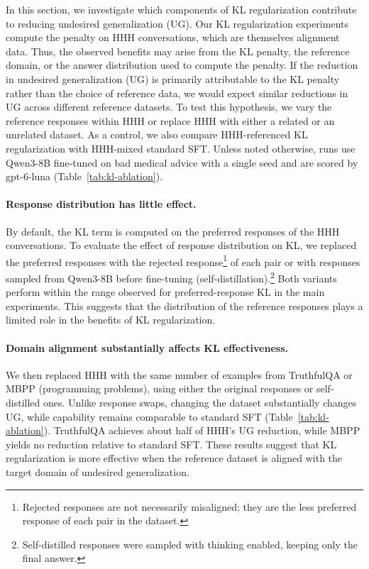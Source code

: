 \documentclass[11pt]{article}
\begin{document}
In this section, we investigate which components of KL regularization contribute to reducing undesired generalization (UG).
Our KL regularization experiments compute the penalty on HHH conversations, which are themselves alignment data. Thus, the observed benefits may arise from the KL penalty, the reference domain, or the answer distribution used to compute the penalty.
If the reduction in undesired generalization (UG) is primarily attributable to the KL penalty rather than the choice of reference data, we would expect similar reductions in UG across different reference datasets. To test this hypothesis, we vary the reference responses within HHH or replace HHH with either a related or an unrelated dataset.
As a control, we also compare HHH-referenced KL regularization with HHH-mixed standard SFT.
Unless noted otherwise, runs use Qwen3-8B fine-tuned on bad medical advice with a single seed and
are scored by gpt-6-luna (Table~\ref{tab:kl-ablation}).

\paragraph{Response distribution has little effect.}
By default, the KL term is computed on the preferred responses of the HHH conversations. To evaluate the
effect of response distribution on KL, we replaced the preferred responses with the rejected
response\footnote{Rejected responses are not necessarily misaligned; they are the less preferred response
of each pair in the dataset.} of each pair or with responses sampled from Qwen3-8B before fine-tuning
(self-distillation).\footnote{Self-distilled responses were sampled with thinking enabled, keeping only the
final answer.} Both variants perform within the range observed for preferred-response KL in the main
experiments. This suggests that the distribution of the reference responses plays a limited role in the
benefits of KL regularization.

\paragraph{Domain alignment substantially affects KL effectiveness.}
We then replaced HHH with the same number of examples from TruthfulQA \citep{lin2022truthfulqa}
or MBPP \citep{austin2021program} (programming problems), using either the original responses or
self-distilled ones. Unlike response swaps, changing the dataset substantially changes UG,
while capability remains comparable to standard SFT (Table~\ref{tab:kl-ablation}). TruthfulQA achieves
about half of HHH's UG reduction, while MBPP yields no reduction relative to standard SFT. These results
suggest that KL regularization is more effective when the reference dataset is aligned with the target
domain of undesired generalization.
\end{document}
